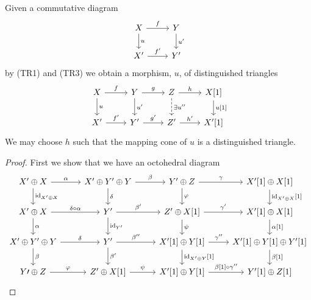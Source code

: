 \documentclass[dissertation.tex]{subfiles}
\begin{document}
\begin{prop}
  Given a commutative diagram
  $$\begin{tikzcd}
    X \arrow{r}{f}\arrow{d}{u} & Y\arrow{d}{u^\prime}\\
    X^\prime \arrow{r}{f^\prime} & Y^\prime
  \end{tikzcd}$$
  by (TR1) and (TR3) we obtain a morphism, $u$, of distinguished triangles
  $$\begin{tikzcd}
      X \arrow{r}{f}\arrow{d}{u} & Y\arrow{d}{u^\prime}\arrow{r}{g} & Z \arrow{r}{h}\arrow[dashed]{d}{\exists u^{\prime\prime}} & X[1]\arrow{d}{u[1]}\\
    X^\prime \arrow{r}{f^\prime} & Y^\prime \arrow{r}{g^\prime} & Z^\prime \arrow{r}{h^\prime} & X^\prime[1]
  \end{tikzcd}$$
  We may choose $h$ such that the mapping cone of $u$ is a distinguished triangle.

\begin{proof}
  First we show that we have an octohedral diagram
  $$\begin{tikzcd}
    X^\prime \oplus X \arrow{r}{\alpha}\arrow{d}{\id_{X^\prime \oplus X}} & X^\prime \oplus Y^\prime \oplus Y \arrow{r}{\beta}\arrow{d}{\delta} & Y^\prime \oplus Z \arrow{r}{\gamma}\arrow{d}{\varphi} & X^\prime[1] \oplus X[1]\arrow{d}{\id_{X^\prime \oplus X}[1]}\\
    X^\prime \oplus X \arrow{r}{\delta \circ \alpha}\arrow{d}{\alpha} & Y^\prime \arrow{r}{\beta^\prime}\arrow{d}{\id_{Y^\prime}} & Z^\prime \oplus X[1] \arrow{r}{\gamma^\prime}\arrow{d}{\psi} & X^\prime[1] \oplus X[1]\arrow{d}{\alpha[1]}\\
    X^\prime \oplus Y^\prime \oplus Y \arrow{r}{\delta}\arrow{d}{\beta} & Y^\prime \arrow{r}{\beta^{\prime\prime}}\arrow{d}{\beta^\prime} & X^\prime[1] \oplus Y[1] \arrow{r}{\gamma^{\prime\prime}}\arrow{d}{\id_{X^\prime \oplus Y}[1]} & X^\prime[1] \oplus Y[1] \oplus Y^\prime[1]\arrow{d}{\beta[1]}\\
    Y\prime \oplus Z \arrow{r}{\varphi} & Z^\prime \oplus X[1] \arrow{r}{\psi} & X^\prime[1] \oplus Y[1] \arrow{r}{\beta[1] \circ \gamma^{\prime\prime}} & Y^\prime[1] \oplus Z[1]
  \end{tikzcd}$$
  

\end{proof}
\end{prop}
\end{document}
